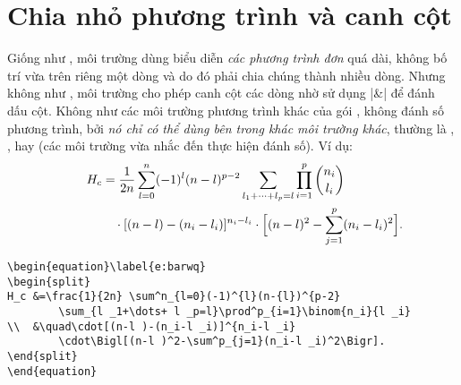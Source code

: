 \documentclass[11pt,leqno,titlepage,openany]{amsldoc}[1999/12/13]
\begin{document}
\section{Chia nhỏ phương trình và canh cột}

Giống như , môi trường  dùng biểu diễn
\emph{các phương trình đơn} quá dài, không bố trí vừa trên riêng một dòng
và do đó phải chia chúng thành nhiều dòng.
Nhưng không như , môi trường 
cho phép canh cột các dòng nhờ sử dụng |&| để đánh dấu cột.
Không như các môi trường phương trình khác của gói ,
 không đánh số phương trình, bởi \emph{nó chỉ có thể dùng
bên trong khác môi trường khác}, thường là
, , hay 
(các môi trường vừa nhắc đến thực hiện đánh số). Ví dụ:
\begin{equation}\label{e:barwq}\begin{split}
H_c&=\frac{1}{2n} \sum^n_{l=0}(-1)^{l}(n-{l})^{p-2}
\sum_{l _1+\dots+ l _p=l}\prod^p_{i=1} \binom{n_i}{l _i}\\
&\quad\cdot[(n-l )-(n_i-l _i)]^{n_i-l _i}\cdot
\Bigl[(n-l )^2-\sum^p_{j=1}(n_i-l _i)^2\Bigr].
\kern-2em %
\end{split}\end{equation}

\begin{verbatim}
\begin{equation}\label{e:barwq}
\begin{split}
H_c &=\frac{1}{2n} \sum^n_{l=0}(-1)^{l}(n-{l})^{p-2}
	    \sum_{l _1+\dots+ l _p=l}\prod^p_{i=1}\binom{n_i}{l _i}
\\  &\quad\cdot[(n-l )-(n_i-l _i)]^{n_i-l _i}
        \cdot\Bigl[(n-l )^2-\sum^p_{j=1}(n_i-l _i)^2\Bigr].
\end{split}
\end{equation}
\end{verbatim}
\end{document}
